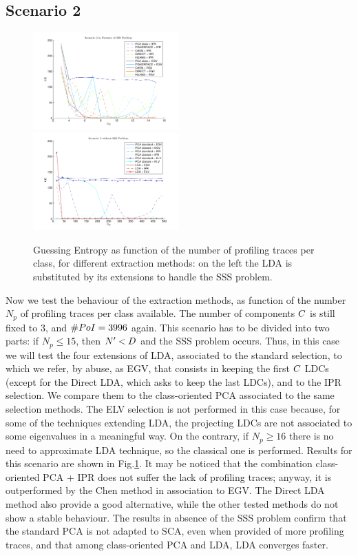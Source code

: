 \subsection{Scenario 2}
\begin{figure}
\includegraphics[width=0.5\textwidth]{figures/Criterion2SSS.pdf}
\includegraphics[width=0.5\textwidth]{figures/Criterion2notSSS.pdf} 
\caption{Guessing Entropy as function of the number of profiling traces per class, for different extraction methods: on the left the LDA is substituted by its extensions to handle the SSS problem.}\label{fig:2}
\end{figure}
Now we test the behaviour of the extraction methods, as function of the number $N_p$ of profiling traces per class available. The number of components $\newTraceLength$ is still fixed to 3, and $\numPoI=3996$ again. This scenario has to be divided into two parts: if $N_p\leq 15$, then $\numTraces[]'<\traceLength$ and the SSS problem occurs. Thus, in this case we will test the four extensions of LDA, associated to the standard selection, to which we refer, by abuse, as EGV, that consists in keeping the first $\newTraceLength$ LDCs (except for the Direct LDA, which asks to keep the last LDCs), and to the IPR selection.  We compare them to the class-oriented PCA associated to the same selection methods. The ELV selection is not performed in this case because, for some of the techniques extending LDA, the projecting LDCs are not associated to some eigenvalues in a meaningful way. On the contrary, if $N_p\geq 16$ there is no need to approximate LDA technique, so the classical one is performed. Results for this scenario are shown in Fig.\ref{fig:2}. It may be noticed that the combination class-oriented PCA + IPR does not suffer the lack of profiling traces; anyway, it is outperformed by the Chen method in association to EGV. The Direct LDA method also provide a good alternative, while the other tested methods do not show a stable behaviour. The results in absence of the SSS problem confirm that the standard PCA is not adapted to SCA, even when provided of more profiling traces, and that among class-oriented PCA and LDA, LDA converges faster.



